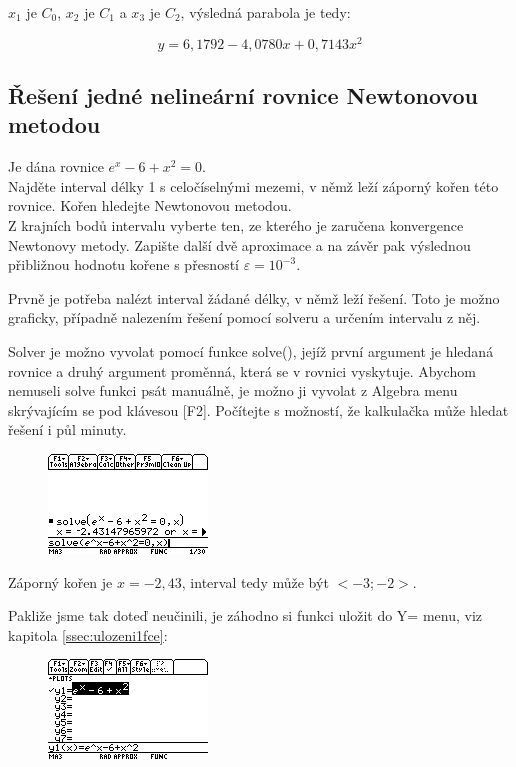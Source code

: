 \documentclass[10pt,a4paper,float]{article}
\begin{document}
$x_1$ je $C_0$, $x_2$ je $C_1$ a $x_3$ je $C_2$, výsledná parabola je tedy:

\[
	y = 6,1792 - 4,0780 x + 0,7143 x^2
\]

\subsection{Řešení jedné nelineární rovnice Newtonovou metodou}
\label{ssec:1newton}
Je dána rovnice $e^x - 6 + x^2 = 0$.\\
Najděte interval délky 1 s celočíselnými mezemi, v němž leží záporný kořen této rovnice. Kořen hledejte Newtonovou metodou.\\
Z krajních bodů intervalu vyberte ten, ze kterého je zaručena konvergence Newtonovy metody. Zapište další dvě aproximace a na závěr pak výslednou přibližnou hodnotu kořene s přesností $\varepsilon = 10^{-3}$.

Prvně je potřeba nalézt interval žádané délky, v němž leží řešení. Toto je možno graficky, případně nalezením řešení pomocí solveru a určením intervalu z něj.

Solver je možno vyvolat pomocí funkce solve(), jejíž první argument je hledaná rovnice a druhý argument proměnná, která se v rovnici vyskytuje. Abychom nemuseli solve funkci psát manuálně, je možno ji vyvolat z Algebra menu skrývajícím se pod klávesou [F2]. Počítejte s možností, že kalkulačka může hledat řešení i půl minuty.

\begin{figure}[H]
	\centering
	\includegraphics[width=.5\textwidth]{img/1NEWTON1.PNG}
\end{figure}

Záporný kořen je $x = -2,43$, interval tedy může být $<-3; -2>$.

\pagebreak

Pakliže jsme tak doteď neučinili, je záhodno si funkci uložit do Y= menu, viz kapitola \ref{ssec:ulozeni1fce}:

\begin{figure}[H]
	\centering
	\includegraphics[width=.5\textwidth]{img/1NEWTON2.PNG}
\end{figure}
\end{document}
